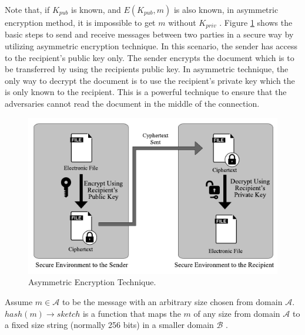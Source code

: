 		Note that, if $K_{pub}$ is known, and $E(K_{pub},m)$ is also known, in asymmetric encryption method, it is impossible to get $m$ without $K_{priv}$ \cite{stallings2017cryptography}.
		Figure \ref{fig:AssymmetricEncryption} shows the basic steps to send and receive messages between two parties in a secure way by utilizing asymmetric encryption technique. In this scenario, the sender has access to the recipient's public key only. The sender encrypts the document which is to be transferred by using the recipients public key. In asymmetric technique, the only way to decrypt the document is to use the recipient's private key which the is only known to the recipient. This is a powerful technique to ensure that the adversaries cannot read the document in the middle of the connection.

		\begin{figure}
			\centering
			\includegraphics[width=\textwidth]{figs/asymmetricEncryption.pdf}
			\caption{Asymmetric Encryption Technique.}
			\label{fig:AssymmetricEncryption}
		\end{figure}
		\begin{defn}
			Assume $m \in \mathcal{A}$ to be the message with an arbitrary size chosen from domain $\mathcal{A}$. $hash(m)\rightarrow sketch$ is a function that maps the $m$ of any size from domain $\mathcal{A}$ to a fixed size string (normally 256 bits) in a smaller domain $\mathcal{B}$ \cite{aumasson2014thehash}.
		\label{dfn:hash_function}
		\end{defn}
